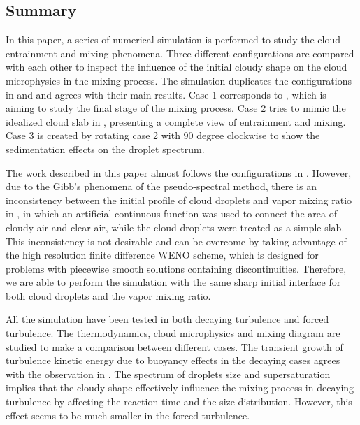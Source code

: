 \subsection{Summary}
In this paper, a series of numerical simulation is performed to study the cloud
entrainment and mixing phenomena. Three different configurations are compared
with each other to inspect the influence of the initial cloudy shape on the
cloud microphysics in the mixing process. The simulation duplicates the
configurations in \cite{Andrejczuk2004} and \cite{Kumar2012Cloud} and agrees with their main
results. Case 1 corresponds to \cite{Andrejczuk2004}, which is aiming to study the final
stage of the mixing process. Case 2 tries to mimic the idealized cloud slab in
\cite{Kumar2012Cloud}, presenting a complete view of entrainment and mixing. Case 3 is
created by rotating case 2 with $90$ degree clockwise to show the sedimentation
effects on the droplet spectrum.

The work described in this paper almost follows the configurations in
\cite{Kumar2012Cloud}. However, due to the Gibb's phenomena of the pseudo-spectral
method, there is an inconsistency between the initial profile of cloud droplets
and vapor mixing ratio in \cite{Kumar2012Cloud}, in which an artificial continuous
function was used to connect the area of cloudy air and clear air, while the
cloud droplets were treated as a simple slab. This inconsistency is not
desirable and can be overcome by taking advantage of the high resolution finite
difference WENO scheme, which is designed for problems with piecewise smooth
solutions containing discontinuities. Therefore, we are able to perform the
simulation with the same sharp initial interface for both cloud droplets and
the vapor mixing ratio.

All the simulation have been tested in both decaying turbulence and forced
turbulence. The thermodynamics, cloud microphysics and mixing diagram are
studied to make a comparison between different cases. The transient growth of
turbulence kinetic energy due to buoyancy effects in the decaying cases agrees
with the observation in \cite{Kumar2014Lagrangian}. The spectrum of droplets size and
supersaturation implies that the cloudy shape effectively influence the mixing
process in decaying turbulence by affecting the reaction time and the size
distribution. However, this effect seems to be much smaller in the forced
turbulence.


